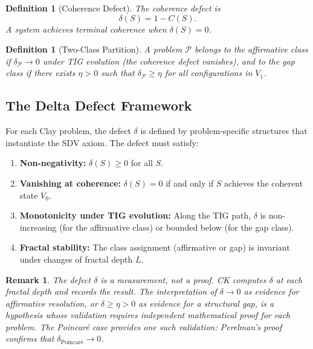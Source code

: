 \documentclass[11pt]{article}
\newtheorem{definition}[theorem]{Definition}
\newtheorem{remark}[theorem]{Remark}
\begin{document}
\begin{definition}[Coherence Defect]
\label{def:defect}
The \emph{coherence defect} is
\[
\delta(S) = 1 - C(S).
\]
A system achieves \emph{terminal coherence} when $\delta(S) = 0$.
\end{definition}

\begin{definition}[Two-Class Partition]
\label{def:two-class}
A problem $\mathcal{P}$ belongs to the \emph{affirmative class} if
$\delta_{\mathcal{P}} \to 0$ under TIG evolution (the coherence
defect vanishes), and to the \emph{gap class} if there exists
$\eta > 0$ such that $\delta_{\mathcal{P}} \geq \eta$ for all
configurations in $V_1$.
\end{definition}

\subsection{The Delta Defect Framework}
\label{subsec:delta}

For each Clay problem, the defect $\delta$ is defined by
problem-specific structures that instantiate the SDV axiom.
The defect must satisfy:

\begin{enumerate}
\item \textbf{Non-negativity:} $\delta(S) \geq 0$ for all $S$.
\item \textbf{Vanishing at coherence:} $\delta(S) = 0$ if and only
if $S$ achieves the coherent state $V_0$.
\item \textbf{Monotonicity under TIG evolution:} Along the TIG path,
$\delta$ is non-increasing (for the affirmative class) or
bounded below (for the gap class).
\item \textbf{Fractal stability:} The class assignment (affirmative
or gap) is invariant under changes of fractal depth $L$.
\end{enumerate}

\begin{remark}
The defect $\delta$ is a measurement, not a proof.  CK computes
$\delta$ at each fractal depth and records the result.  The
\emph{interpretation} of $\delta \to 0$ as evidence for affirmative
resolution, or $\delta \geq \eta > 0$ as evidence for a structural
gap, is a hypothesis whose validation requires independent mathematical
proof for each problem.  The Poincar\'e case provides one such
validation: Perelman's proof confirms that $\delta_{\text{Poincar\'e}}
\to 0$.
\end{remark}
\end{document}
